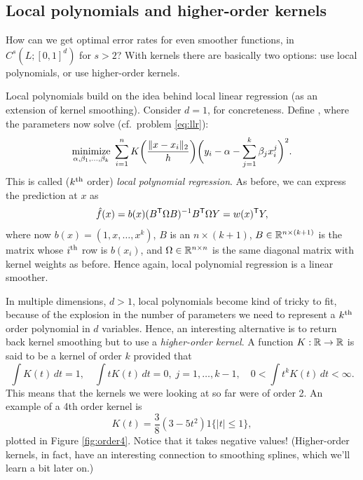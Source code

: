 \documentclass{article}
\begin{document}
\subsection{Local polynomials and higher-order kernels}

How can we get optimal error rates for even smoother functions, in $C^s(L;
[0,1]^d)$ for $s > 2$? With kernels there are basically two options: use
local polynomials, or use higher-order kernels.

Local polynomials build on the idea behind local linear regression (as an
extension of kernel smoothing). Consider $d=1$, for concreteness. Define
, where the
parameters  now solve 
(cf.\ problem \eqref{eq:llr}):
\begin{equation}
\label{eq:local_poly}
\mathop{\mathrm{minimize}}_{\alpha, \beta_1,\dots,\beta_k} \; \sum_{i=1}^n K\bigg(
\frac{\|x-x_i\|_2}{h} \bigg) \bigg(y_i - \alpha - \sum_{j=1}^k \beta_j x_i^j 
\bigg)^2. 
\end{equation}
This is called ($k^{\text{th}}$ order) \emph{local polynomial regression}. As before, we 
can express the prediction at $x$ as
\[
\hat{f}(x) = b(x)(B^{\mathsf{T}} \Omega B)^{-1} B^{\mathsf{T}} \Omega Y = w(x)^{\mathsf{T}} Y,
\]
where now $b(x) = (1,x,\dots,x^k)$, $B$ is an $n \times (k+1)$, $B \in \mathbb{R}^{n 
  \times (k+1)}$ is the matrix whose $i^{\text{th}}$ row is $b(x_i)$, and $\Omega \in
\mathbb{R}^{n \times n}$ is the same diagonal matrix with kernel weights as
before. Hence again, local polynomial regression is a linear smoother. 

In multiple dimensions, $d>1$, local polynomials become kind of tricky to fit,
because of the explosion in the number of parameters we need to represent a
$k^{\text{th}}$ order polynomial in $d$ variables. Hence, an interesting alternative is
to return back kernel smoothing but to use a \emph{higher-order kernel}. A
function $K : \mathbb{R} \to \mathbb{R}$ is said to be a kernel of order $k$ provided that
\[ 
\int K(t) \, dt = 1, \quad
\int t K(t) \, dt = 0, \; j=1,\dots,k-1, \quad
0 < \int t^k K(t) \, dt < \infty.
\]
This means that the kernels we were looking at so far were of order 2. An
example of a 4th order kernel is  
\[
K(t) = \frac{3}{8}(3-5t^2) 1\{|t|\leq 1\}, 
\]
plotted in Figure \ref{fig:order4}. Notice that it takes negative values!
(Higher-order kernels, in fact, have an interesting connection to smoothing 
splines, which we'll learn a bit later on.)
\end{document}
